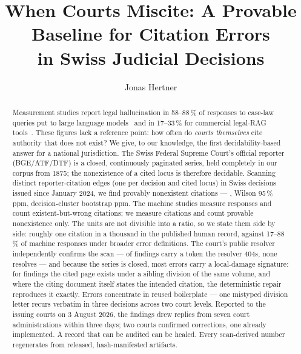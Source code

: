 \documentclass[11pt,a4paper]{article}
\title{When Courts Miscite: A Provable Baseline for Citation Errors\\
in Swiss Judicial Decisions}
\author[1]{Jonas Hertner}
\affil[1]{OpenCaseLaw}
\newcommand{\RLetterDate}{3 August 2026}
\newcommand{\RNReplied}{seven}
\newcommand{\RNReplyDays}{three}
\begin{document}
\maketitle

\begin{abstract}
Measurement studies report legal hallucination in 58--88\,\% of
responses to case-law queries put to large language
models~\cite{dahl2024} and in 17--33\,\% for commercial legal-RAG
tools~\cite{magesh2024}. These figures lack a reference point: how
often do \emph{courts themselves} cite authority that does not exist?
We give, to our knowledge, the first decidability-based answer for a
national jurisdiction. The Swiss Federal Supreme Court's official
reporter (BGE/ATF/DTF) is a closed, continuously paginated series,
held completely in our corpus from 1875; the nonexistence of a cited
locus is therefore decidable. Scanning \NDenomTokens{} distinct
reporter-citation edges (one per decision and cited locus) in
\NWindowDecisions{} Swiss decisions issued since January 2024, we find
\NFindings{} provably nonexistent citations --- \RatePpm{}, Wilson
95\,\% \RateWilson{} ppm, decision-cluster bootstrap \RateCluster{}
ppm. The machine studies measure responses and count existent-but-wrong
citations; we measure citations and count provable nonexistence only.
The units are not divisible into a ratio, so we state them side by
side: roughly one citation in a thousand in the published human record,
against 17--88\,\% of machine responses under broader error
definitions. The court's public resolver independently confirms the
scan --- \NFindConfirmed{} of \NFindings{} findings carry a token the
resolver 404s, none resolves --- and because the series is closed,
most errors carry a local-damage signature: for \NMechDivision{}
findings the cited page exists under a sibling division of the same
volume, and where the citing document itself states the intended
citation, the deterministic repair reproduces it exactly. Errors
concentrate in reused boilerplate --- one mistyped division letter
recurs verbatim in three decisions across two court levels. Reported
to the issuing courts on \RLetterDate{}, the findings drew replies
from \RNReplied{} court administrations within \RNReplyDays{} days;
two courts confirmed corrections, one already implemented. A record
that can be audited can be healed. Every scan-derived number
regenerates from released, hash-manifested artifacts.
\end{abstract}

\end{document}
